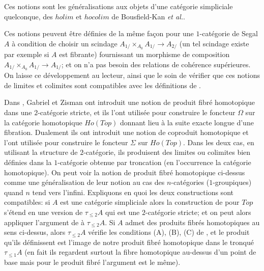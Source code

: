 \documentclass[12pt]{article}
\begin{document}
Ces notions sont les g\'en\'eralisations aux objets d'une cat\'egorie
simpliciale quelconque, des $holim$ et $hocolim$ de Bousfield-Kan
\cite{BousfieldKan} {\em et al.}.

Ces notions peuvent \^etre d\'efinies de la m\^eme fa\c{c}on
pour une $1$-cat\'egorie de Segal $A$ \`a condition de
choisir un scindage $A_{1/}\times
_{A_0}A_{1/}\rightarrow A_{2/}$ (un tel scindage existe par exemple
si $A$ est fibrante)
fournissant un morphisme de composition
$A_{1/}\times
_{A_0}A_{1/}\rightarrow A_{1/}$; et on n'a pas besoin des relations de
coh\'erence
sup\'erieures. On laisse ce d\'eveloppement
au lecteur, ainsi que le soin de v\'erifier que ces
notions de limites et colimites sont compatibles avec les d\'efinitions de
\cite{limits}.

Dans \cite{GabrielZisman}, Gabriel et Zisman ont introduit une notion de produit
fibr\'e homotopique dans une $2$-cat\'egorie stricte, et ils l'ont utilis\'ee
pour construire le foncteur $\Omega$ sur la cat\'egorie homotopique $Ho(Top)$
donnant lieu \`a la suite exacte longue d'une fibration. Dualement ils
ont introduit une
notion de coproduit homotopique et l'ont utilis\'ee pour construire le
foncteur $\Sigma$
sur $Ho(Top)$. Dans les deux cas, en utilisant la structure de
$2$-cat\'egorie, ils
produisent des limites ou colimites bien d\'efinies dans la
$1$-cat\'egorie obtenue par troncation (en l'occurrence la cat\'egorie
homotopique). On peut voir la notion de produit fibr\'e homotopique ci-dessus
comme une g\'en\'eralisation de leur notion au cas des
$n$-cat\'egories ($1$-groupiques) quand
$n$ tend vers l'infini. Expliquons en quoi les deux constructions sont
compatibles:
si $A$ est une cat\'egorie simpliciale alors la construction de
\cite{GabrielZisman}
pour $Top$ s'\'etend en une version de $\tau _{\leq 2}A$ qui est une
$2$-cat\'egorie stricte; et on peut alors appliquer l'argument de
\cite{GabrielZisman} \`a
$\tau _{\leq 2}A$. Si $A$ admet des produits fibr\'es homotopiques au sens
ci-dessus, alors $\tau _{\leq 2}A$ v\'erifie les conditions (A), (B),
(C)
de \cite{GabrielZisman},
et le produit qu'ils d\'efinissent est l'image de notre produit
fibr\'e homotopique dans le tronqu\'e $\tau _{\leq 1}A$
(en fait ils regardent
surtout la fibre homotopique au-dessus d'un point de base mais pour le produit
fibr\'e l'argument est le m\^eme).
\end{document}
